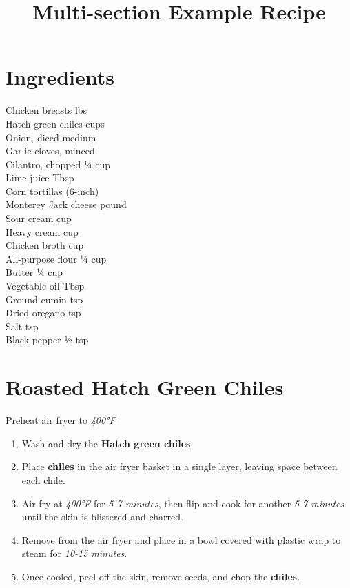 \documentclass[11pt,letterpaper]{article}
\title{Multi-section Example Recipe}
\author{}
\date{}
\begin{document}
\maketitle
\thispagestyle{empty}

\section*{Ingredients}
\setlength{\columnsep}{20pt}
\begin{multicols}{2}
\noindent
    Chicken breasts  lbs \\
    Hatch green chiles  cups \\
    Onion, diced  medium \\
    Garlic cloves, minced  \\
    Cilantro, chopped \dotfill ¼ cup \\
    Lime juice  Tbsp \\
    Corn tortillas  (6-inch) \\
    Monterey Jack cheese  pound \\
    \columnbreak
    Sour cream  cup \\
    Heavy cream  cup \\
    Chicken broth  cup \\
    All-purpose flour \dotfill ¼ cup \\
    Butter \dotfill ¼ cup \\
    Vegetable oil  Tbsp \\
    Ground cumin  tsp \\
    Dried oregano  tsp \\
    Salt  tsp \\
    Black pepper \dotfill ½ tsp \\
\end{multicols}

\section*{Roasted Hatch Green Chiles}
Preheat air fryer to \textit{400°F}

\begin{enumerate}
    \item Wash and dry the \textbf{Hatch green chiles}.
    \item Place \textbf{chiles} in the air fryer basket in a single layer, leaving space between each chile.
    \item Air fry at \textit{400°F} for \textit{5-7 minutes}, then flip and cook for another \textit{5-7 minutes} until the skin is blistered and charred.
    \item Remove from the air fryer and place in a bowl covered with plastic wrap to steam for \textit{10-15 minutes}.
    \item Once cooled, peel off the skin, remove seeds, and chop the \textbf{chiles}.
\end{enumerate}
\end{document}
